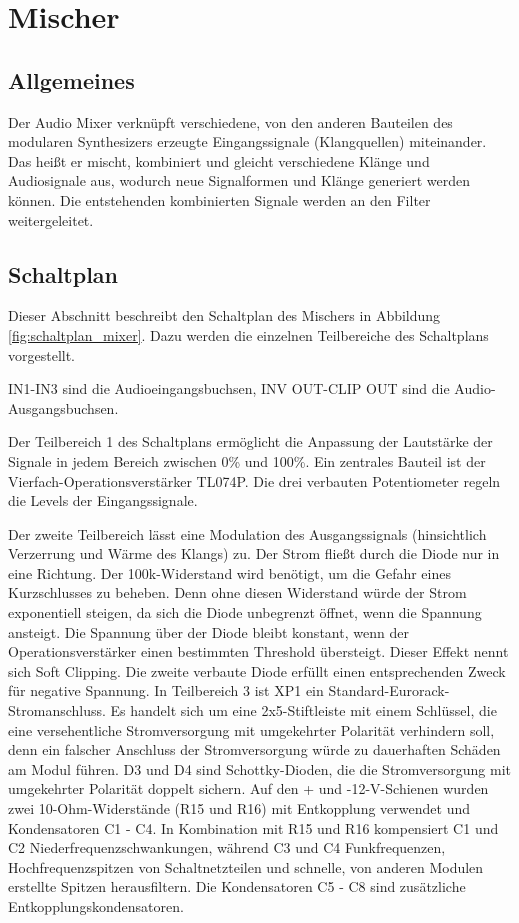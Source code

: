 \chapter{Mischer}
\label{ch:concept}
\section{Allgemeines}
Der Audio Mixer verknüpft verschiedene, von den anderen Bauteilen des modularen Synthesizers erzeugte Eingangssignale (Klangquellen) miteinander. Das heißt er mischt, kombiniert und gleicht verschiedene Klänge und Audiosignale aus, wodurch neue Signalformen
und Klänge generiert werden können. Die entstehenden kombinierten Signale werden an den Filter weitergeleitet.


\section{Schaltplan}
Dieser Abschnitt beschreibt den Schaltplan des Mischers in Abbildung \ref{fig:schaltplan_mixer}. 
Dazu werden die einzelnen Teilbereiche des Schaltplans vorgestellt.

IN1-IN3 sind die Audioeingangsbuchsen, INV OUT-CLIP OUT sind die Audio-Ausgangsbuchsen.

Der Teilbereich 1 des Schaltplans ermöglicht die Anpassung der Lautstärke der Signale in jedem Bereich zwischen 0\% und 100\%. 
Ein zentrales Bauteil ist der Vierfach-Operationsverstärker TL074P. Die drei verbauten Potentiometer regeln die Levels der Eingangssignale.

Der zweite Teilbereich lässt eine Modulation des Ausgangssignals (hinsichtlich Verzerrung und Wärme des Klangs) zu. Der Strom fließt durch die Diode nur in eine Richtung. Der 100k-Widerstand wird benötigt, um die Gefahr eines Kurzschlusses zu beheben. Denn ohne diesen Widerstand würde der Strom exponentiell steigen, da sich die Diode unbegrenzt öffnet, wenn die Spannung ansteigt. Die Spannung über der Diode bleibt konstant, wenn der Operationsverstärker einen bestimmten Threshold übersteigt. Dieser Effekt nennt sich Soft Clipping. Die zweite verbaute Diode erfüllt einen entsprechenden Zweck für negative Spannung. 
In Teilbereich 3 ist XP1 ein Standard-Eurorack-Stromanschluss. Es handelt sich um eine 2x5-Stiftleiste mit einem Schlüssel, die eine versehentliche Stromversorgung mit umgekehrter Polarität verhindern soll, denn ein falscher Anschluss der Stromversorgung würde zu dauerhaften Schäden am Modul führen. D3 und D4 sind Schottky-Dioden, die die Stromversorgung mit umgekehrter Polarität doppelt sichern.
Auf den + und -12-V-Schienen wurden zwei 10-Ohm-Widerstände (R15 und R16) mit Entkopplung verwendet und Kondensatoren C1 - C4. In Kombination mit R15 und R16 kompensiert C1 und C2 Niederfrequenzschwankungen, während C3 und C4 Funkfrequenzen, Hochfrequenzspitzen von Schaltnetzteilen und schnelle, von anderen Modulen erstellte Spitzen herausfiltern.
Die Kondensatoren C5 - C8 sind zusätzliche Entkopplungskondensatoren.

